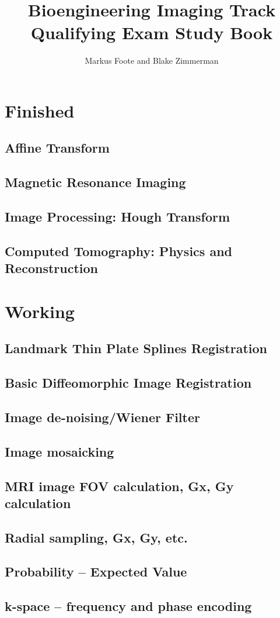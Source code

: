 \documentclass{report}
\title{Bioengineering Imaging Track Qualifying Exam Study Book}
\author{Markus Foote and Blake Zimmerman}
\begin{document}
	\maketitle
	\tableofcontents
	\part{Finished}
	\chapter{Affine Transform}
	
	
	\chapter{Magnetic Resonance Imaging}
	
	
	\chapter{Image Processing: Hough Transform}
	
	
	\chapter{Computed Tomography: Physics and Reconstruction}
	
	\part{Working}
	\chapter{Landmark Thin Plate Splines Registration}
	\chapter{Basic Diffeomorphic Image Registration}
	
	\chapter{Image de-noising/Wiener Filter}
	
	\chapter{Image mosaicking}
	
	\chapter{MRI image FOV calculation, Gx, Gy calculation}
	
	\chapter{Radial sampling, Gx, Gy, etc.}
	
	\chapter{Probability – Expected Value}
	
	\chapter{k-space – frequency and phase encoding}
	
	
	
	
	
	
		
\end{document}
